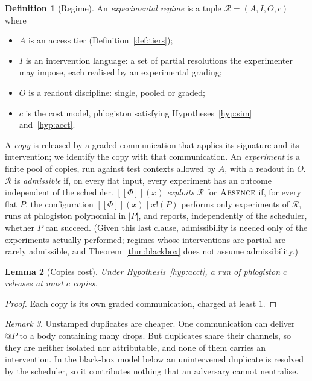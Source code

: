 \documentclass[11pt]{article}
\makeatletter
\theoremstyle{definition}
\newtheorem{definition}{Definition}[section]
\theoremstyle{plain}
\newtheorem{lemma}[definition]{Lemma}
\theoremstyle{remark}
\newtheorem{remark}[definition]{Remark}
\newcommand{\quo}[1]{@#1}
\newcommand{\out}[2]{#1!(#2)}
\newcommand{\enc}[1]{[\![#1]\!]}
\newcommand{\ABS}{\textup{\textsc{Absence}}}
\newcommand{\Reg}{\mathcal{R}}
\makeatother
\begin{document}
\begin{definition}[Regime]\label{def:regime}
An \emph{experimental regime} is a tuple $\Reg = (A, I, O, c)$ where
\begin{itemize}[leftmargin=2.2em,nosep]
\item $A$ is an access tier (Definition~\ref{def:tiers});
\item $I$ is an intervention language: a set of partial resolutions the
experimenter may impose, each realised by an experimental grading;
\item $O$ is a readout discipline: single, pooled or graded;
\item $c$ is the cost model, phlogiston satisfying Hypotheses~\ref{hyp:sim}
and~\ref{hyp:acct}.
\end{itemize}
A \emph{copy} is released by a graded communication that applies its
signature and its intervention; we identify the copy with that
communication. An \emph{experiment} is a finite pool of copies, run
against test contexts allowed by $A$, with a readout in $O$. $\Reg$ is
\emph{admissible} if, on every flat input, every experiment has an
outcome independent of the scheduler. $\enc{\Phi}(x)$ \emph{exploits}
$\Reg$ for $\ABS$ if, for every flat $P$, the configuration
$\enc{\Phi}(x) \mid \out{x}{P}$ performs only experiments of $\Reg$, runs
at phlogiston polynomial in $|P|$, and reports, independently of the
scheduler, whether $P$ can succeed. (Given this last clause,
admissibility is needed only of the experiments actually performed;
regimes whose interventions are partial are rarely admissible, and
Theorem~\ref{thm:blackbox} does not assume admissibility.)
\end{definition}

\begin{lemma}[Copies cost]\label{lem:copies}
Under Hypothesis~\ref{hyp:acct}, a run of phlogiston $c$ releases at most
$c$ copies.
\end{lemma}

\begin{proof}
Each copy is its own graded communication, charged at least $1$.
\end{proof}

\begin{remark}
Unstamped duplicates are cheaper. One communication can deliver $\quo{P}$
to a body containing many drops. But duplicates share their channels, so
they are neither isolated nor attributable, and none of them carries an
intervention. In the black-box model below an unintervened duplicate is
resolved by the scheduler, so it contributes nothing that an adversary
cannot neutralise.
\end{remark}
\end{document}
